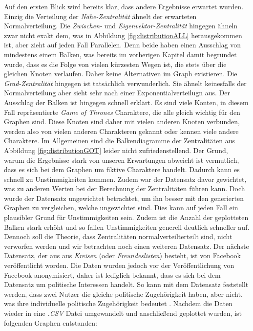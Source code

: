  Auf den ersten Blick wird bereits klar, dass andere Ergebnisse erwartet wurden. Einzig die Verteilung der \textit{Nähe-Zentralität} ähnelt der erwarteten Normalverteilung. Die \textit{Zwischen-} und \textit{Eigenvektor-Zentralität} hingegen ähneln zwar nicht exakt dem, was in Abbildung \ref{fig:distributionALL} herausgekommen ist, aber zieht auf jeden Fall Parallelen. Denn beide haben einen Ausschlag von mindestens einem Balken, was bereits im vorherigen Kapitel damit begründet wurde, dass es die Folge von vielen kürzesten Wegen ist, die stets über die gleichen
Knoten verlaufen. Daher keine Alternativen im Graph existieren. Die \textit{Grad-Zentralität} hingegen ist tatsächlich verwunderlich. Sie ähnelt keinesfalls der Normalverteilung aber sieht sehr nach einer Exponentialverteilugn aus. Der Ausschlag der Balken ist hingegen schnell erklärt. Es sind viele Konten, in diesem Fall repräsentierte \textit{Game of Thrones} Charaktere, die alle gleich wichtig für den Graphen sind. Diese Knoten sind daher mit vielen anderen Knoten verbunden, werden also von vielen anderen Charakteren gekannt oder kennen viele andere Charaktere. Im Allgemeinen sind die Balkendiagramme der Zentralitäten aus Abbildung \ref{fig:distributionGOT} leider nicht zufriedenstellend. Der Grund, warum die Ergebnisse stark von unseren Erwartungen abweicht ist vermutlich, dass es sich bei dem Graphen um fiktive Charaktere handelt. Dadurch kann es schnell zu Unstimmigkeiten kommen. Zudem war der Datensatz davor gewichtet, was zu anderen Werten bei der Berechnung der Zentralitäten führen kann. Doch wurde der Datensatz ungewichtet betrachtet, um ihn besser mit den generierten Graphen zu vergleichen, welche ungewichtet sind. Dies kann auf jeden Fall ein plausibler Grund für Unstimmigkeiten sein. Zudem ist die Anzahl der geplotteten Balken stark erhöht und so fallen Unstimmigkeiten generell deutlich schneller auf. Dennoch soll die Theorie, dass Zentralitäten normalverteilterteilt sind, nicht verworfen werden und wir betrachten noch einen weiteren Datensatz. Der nächste Datensatz, der aus aus \textit{Kreisen} (oder \textit{Freundeslisten}) besteht, ist von Facebook veröffentlicht worden. Die Daten wurden jedoch vor der Veröffentlichung von Facebook anonymisiert, daher ist lediglich bekannt, dass es sich bei dem Datensatz um politische Interessen handelt. So kann mit dem Datensatz feststellt werden, dass zwei Nutzer die gleiche politische Zugehörigkeit haben, aber nicht, was ihre individuelle politische Zugehörigkeit bedeutet \cite{FBData}.
Nachdem die Daten wieder in eine \textit{.CSV} Datei umgewandelt und anschließend geplottet wurden, ist folgenden Graphen entstanden: 



